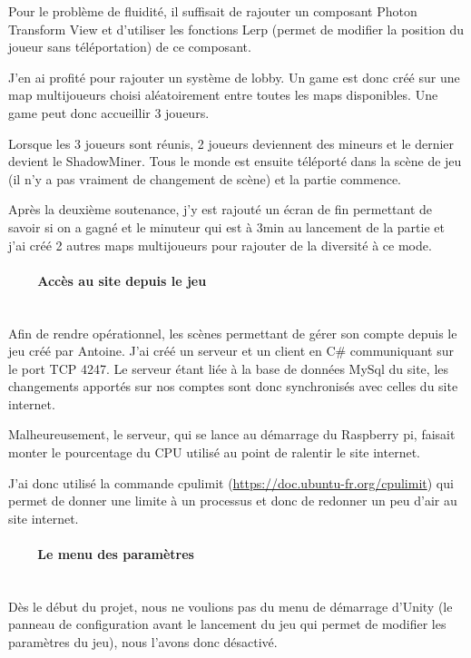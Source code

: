 \documentclass[titlepage, 13px, a4paper]{report}
\begin{document}
Pour le problème de fluidité, il suffisait de rajouter un composant Photon Transform View et d’utiliser les 
fonctions Lerp (permet de modifier la position du joueur sans téléportation) de ce composant.

J’en ai profité pour rajouter un système de lobby. Un game est donc créé sur une map multijoueurs choisi 
aléatoirement entre toutes les maps disponibles. Une game peut donc accueillir 3 joueurs.

Lorsque les 3 joueurs sont réunis, 2 joueurs deviennent des mineurs et le dernier devient le ShadowMiner.
Tous le monde est ensuite téléporté dans la scène de jeu (il n’y a pas vraiment de changement de scène) et la partie commence.

Après la deuxième soutenance, j’y est rajouté un écran de fin permettant de savoir si on a gagné et le minuteur 
qui est à 3min au lancement de la partie et j’ai créé 2 autres maps multijoueurs pour rajouter de la diversité à ce mode. \\


\paragraph{~~~~Accès au site depuis le jeu} \hspace{0pt} \\
Afin de rendre opérationnel, les scènes permettant de gérer son compte depuis le jeu créé par Antoine.
J’ai créé un serveur et un client en C\# communiquant sur le port TCP 4247. Le serveur étant liée à la 
base de données MySql du site, les changements apportés sur nos comptes sont donc synchronisés avec celles du site internet.

Malheureusement, le serveur, qui se lance au démarrage du Raspberry pi, faisait monter le pourcentage 
du CPU utilisé au point de ralentir le site internet.

J’ai donc utilisé la commande cpulimit (\url{https://doc.ubuntu-fr.org/cpulimit}) qui permet de donner une 
limite à un processus et donc de redonner un peu d’air au site internet. \\


\paragraph{~~~~Le menu des paramètres} \hspace{0pt} \\
Dès le début du projet, nous ne voulions pas du menu de démarrage d’Unity (le panneau de configuration avant 
le lancement du jeu qui permet de modifier les paramètres du jeu), nous l’avons donc désactivé.
\end{document}
